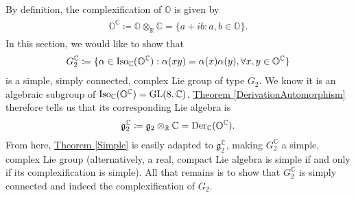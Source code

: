 \noindent\\ By definition, the complexification of $\mathbb{O}$ is given by
\begin{align*}
\begin{split}
\mathbb{O}^\mathbb{C} \coloneqq \mathbb{O} \otimes_\mathbb{R} \mathbb{C} = \{a + ib : a, b \in \mathbb{O}\}.
\end{split}
\end{align*}
\noindent In this section, we would like to show that
\begin{align*}
\begin{split}
G_2^\mathbb{C} \coloneqq \{\alpha \in \textup{Iso}_\mathbb{C}(\mathbb{O}^\mathbb{C}) : \alpha(xy) = \alpha(x)\alpha(y), \forall x, y \in \mathbb{O}^\mathbb{C}\}
\end{split}
\end{align*}
\noindent is a simple, simply connected, complex Lie group of type $G_2$. We know it is an algebraic subgroup of $\textup{Iso}_\mathbb{C}(\mathbb{O}^\mathbb{C}) = \textup{GL}(8, \mathbb{C})$. \hyperref[DerivationAutomorphism]{Theorem \ref*{DerivationAutomorphism}} therefore tells us that its corresponding Lie algebra is
\begin{align*}
\begin{split}
\mathfrak{g}_2^\mathbb{C} \coloneqq \mathfrak{g}_2 \otimes_\mathbb{R} \mathbb{C} = \textup{Der}_\mathbb{C}(\mathbb{O}^\mathbb{C}).
\end{split}
\end{align*}
\noindent From here, \hyperref[Simple]{Theorem \ref*{Simple}} is easily adapted to $\mathfrak{g}_2^\mathbb{C}$, making $G_2^\mathbb{C}$ a simple, complex Lie group (alternatively, a real, compact Lie algebra is simple if and only if its complexification is simple). All that remains is to show that $G_2^\mathbb{C}$ is simply connected and indeed the complexification of $G_2$.\\

